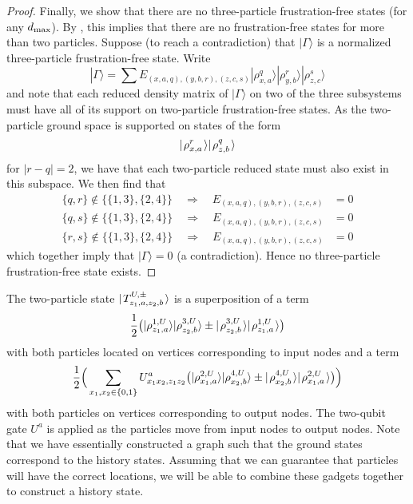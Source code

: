 \documentclass[../thesis-main/thesis-main]{subfiles}
\begin{document}
\begin{proof}
Finally, we show that there are no three-particle frustration-free states (for any $d_{\text{max}}$). By , this implies that there are no frustration-free states for more than two particles. Suppose (to reach a contradiction) that $|\Gamma\rangle$ is a normalized three-particle frustration-free state. Write
\begin{equation}
|\Gamma\rangle=\sum E_{(x,a,q),(y,b,r),(z,c,s)}|\rho_{x,a}^{q}\rangle|\rho_{y,b}^{r}\rangle|\rho_{z,c}^{s}\rangle
\end{equation}
and note that each reduced density matrix of $|\Gamma\rangle$ on two of the three subsystems must have all of its support on two-particle frustration-free states. As the two-particle ground space is supported on states of the form
\begin{equation}
  |\mspace{2mu} \rho_{x,a}^r \mspace{2mu} \rangle|\mspace{2mu} \rho_{z,b}^{q} \mspace{2mu} \rangle
\end{equation}
for $|r-q| = 2$, we have that each two-particle reduced state must also exist in this subspace.  We then find that
\begin{align}
\{q,r\}\notin\{\{1,3\},\{2,4\}\}\quad\Longrightarrow\quad E_{(x,a,q),(y,b,r),(z,c,s)} & =0\\
\{q,s\}\notin\{\{1,3\},\{2,4\}\}\quad\Longrightarrow\quad E_{(x,a,q),(y,b,r),(z,c,s)} & =0\\
\{r,s\}\notin\{\{1,3\},\{2,4\}\}\quad\Longrightarrow\quad E_{(x,a,q),(y,b,r),(z,c,s)} & =0
\end{align}
which together imply that $|\Gamma\rangle=0$ (a contradiction). Hence no three-particle frustration-free state exists.
\end{proof}




The two-particle state $|\mspace{2mu} T_{z_{1},a,z_{2},b}^{U,\pm} \mspace{2mu} \rangle$ is a superposition of a term
\begin{equation}
  \frac{1}{2}\big(|\rho_{z_{1},a}^{1,U}\rangle|\rho_{z_{2},b}^{3,U}\rangle \pm |\mspace{2mu} \rho_{z_2,b}^{3,U} \mspace{2mu} \rangle|\mspace{2mu} \rho_{z_1,a}^{1,U} \mspace{2mu} \rangle\big)
\end{equation}
with both particles located on vertices corresponding to input nodes and a term 
\begin{equation}
  \frac{1}{2}\Big(\sum_{x_{1},x_{2}\in\{0,1\}}U^a_{x_{1}x_{2},z_{1}z_{2}}\big(|\rho_{x_{1},a}^{2,U}\rangle|\rho_{x_{2},b}^{4,U}\rangle \pm |\mspace{2mu} \rho_{x_2,b}^{4,U} \mspace{2mu} \rangle|\mspace{2mu} \rho_{x_1,a}^{2,U} \mspace{2mu} \rangle\big)\Big)
\end{equation}
with both particles on vertices corresponding to output nodes. The two-qubit gate $U^a$
is applied as the particles move from input nodes to output nodes.  Note that we have essentially constructed a graph such that the ground states correspond to the history states.  Assuming that we can guarantee that particles will have the correct locations, we will be able to combine these gadgets together to construct a history state.
\end{document}

